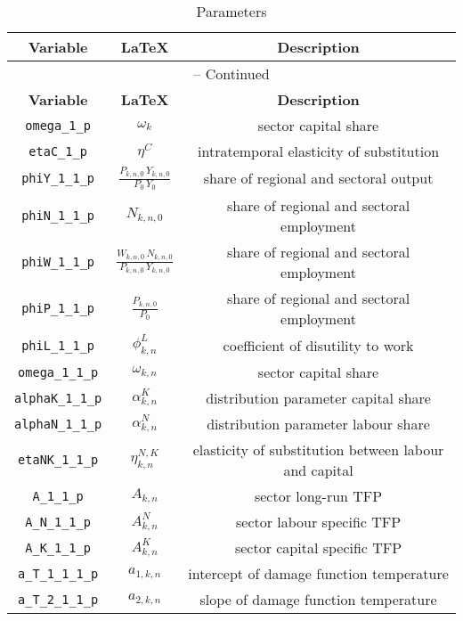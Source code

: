 \begin{center}
\begin{longtable}{ccc}
\caption{Parameters}\\%
\hline%
\multicolumn{1}{c}{\textbf{Variable}} &
\multicolumn{1}{c}{\textbf{\LaTeX}} &
\multicolumn{1}{c}{\textbf{Description}}\\%
\hline\hline%
\endfirsthead
\multicolumn{3}{c}{{\tablename} \thetable{} -- Continued}\\%
\hline%
\multicolumn{1}{c}{\textbf{Variable}} &
\multicolumn{1}{c}{\textbf{\LaTeX}} &
\multicolumn{1}{c}{\textbf{Description}}\\%
\hline\hline%
\endhead
\texttt{omega\_1\_p} & ${\omega_{k}}$ & sector capital share\\
\texttt{etaC\_1\_p} & ${\eta^{C}}$ & intratemporal elasticity of substitution\\
\texttt{phiY\_1\_1\_p} & $\frac{P_{k,n,0} \, Y_{k,n,0}}{P_{0} \, Y_{0}}$ & share of regional and sectoral output\\
\texttt{phiN\_1\_1\_p} & ${N_{k,n,0}}$ & share of regional and sectoral employment\\
\texttt{phiW\_1\_1\_p} & $\frac{W_{k,n,0} \, N_{k,n,0}}{P_{k,n,0} \, Y_{k,n,0}}$ & share of regional and sectoral employment\\
\texttt{phiP\_1\_1\_p} & $\frac{P_{k,n,0}}{P_{0}}$ & share of regional and sectoral employment\\
\texttt{phiL\_1\_1\_p} & ${\phi^{L}_{k,n}}$ & coefficient of disutility to work\\
\texttt{omega\_1\_1\_p} & ${\omega_{k,n}}$ & sector capital share\\
\texttt{alphaK\_1\_1\_p} & ${\alpha^{K}_{k,n}}$ & distribution parameter capital share\\
\texttt{alphaN\_1\_1\_p} & ${\alpha^{N}_{k,n}}$ & distribution parameter labour share\\
\texttt{etaNK\_1\_1\_p} & ${\eta^{N,K}_{k,n}}$ & elasticity of substitution between labour and capital\\
\texttt{A\_1\_1\_p} & ${A_{k,n}}$ & sector long-run TFP\\
\texttt{A\_N\_1\_1\_p} & ${A^{N}_{k,n}}$ & sector labour specific TFP\\
\texttt{A\_K\_1\_1\_p} & ${A^{K}_{k,n}}$ & sector capital specific TFP\\
\texttt{a\_T\_1\_1\_1\_p} & ${a_{1,k,n}}$ & intercept of damage function temperature\\
\texttt{a\_T\_2\_1\_1\_p} & ${a_{2,k,n}}$ & slope of damage function temperature\\

\end{longtable}
\end{center}
